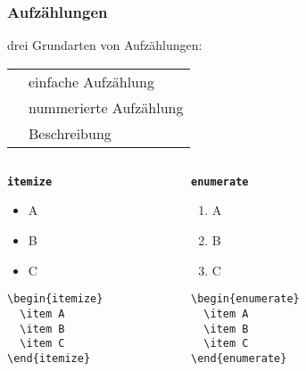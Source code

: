 \begin{frame}[fragile]
	\frametitle{Aufzählungen}
	\vspace{-0.5cm}
	drei Grundarten von Aufzählungen: \\
	\begin{tabular}{rl}
		\emphkeyword{itemize} & einfache Aufzählung\\
		\emphkeyword{enumerate} & nummerierte Aufzählung\\
		\emphkeyword{description} & Beschreibung
	\end{tabular}\par \vfill
	
	\begin{columns}[T]
		\begin{column}{0.31\textwidth}
			\begin{block}{\tt\bfseries itemize}
				\begin{itemize}
					\item A \item B \item C
				\end{itemize} 
				\begin{lstlisting}
\begin{itemize}
  \item A
  \item B
  \item C
\end{itemize}
				\end{lstlisting}
			\end{block}
		\end{column}
		\begin{column}{0.31\textwidth}
			\begin{block}{\tt\bfseries enumerate}
				\begin{enumerate}
					\item A \item B \item C
				\end{enumerate} 
				\begin{lstlisting}
\begin{enumerate}
  \item A
  \item B
  \item C
\end{enumerate}
				\end{lstlisting}
			\end{block}
		\end{column}
		\begin{column}{0.31\textwidth}

\end{column}
\end{columns}
\end{frame}
